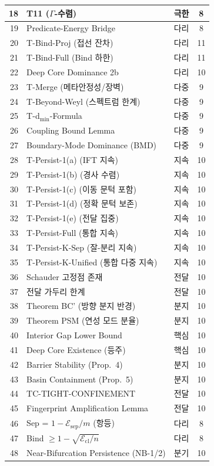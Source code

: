 \begin{table}[h]
\begin{tabular}{rllc}
18 & T11 ($\Gamma$-수렴) & 극한 & 8 \\
\midrule
19 & Predicate-Energy Bridge & 다리 & 8 \\
20 & T-Bind-Proj (접선 잔차) & 다리 & 11 \\
21 & T-Bind-Full (Bind 하한) & 다리 & 11 \\
22 & Deep Core Dominance 2b & 다리 & 10 \\
\midrule
23 & T-Merge (메타안정성/장벽) & 다중 & 9 \\
24 & T-Beyond-Weyl (스펙트럼 한계) & 다중 & 9 \\
25 & T-d$_{\min}$-Formula & 다중 & 9 \\
26 & Coupling Bound Lemma & 다중 & 9 \\
27 & Boundary-Mode Dominance (BMD) & 다중 & 9 \\
\midrule
28 & T-Persist-1(a) (IFT 지속) & 지속 & 10 \\
29 & T-Persist-1(b) (경사 수렴) & 지속 & 10 \\
30 & T-Persist-1(c) (이동 문턱 포함) & 지속 & 10 \\
31 & T-Persist-1(d) (정확 문턱 보존) & 지속 & 10 \\
32 & T-Persist-1(e) (전달 집중) & 지속 & 10 \\
33 & T-Persist-Full (통합 지속) & 지속 & 10 \\
34 & T-Persist-K-Sep (잘-분리 지속) & 지속 & 10 \\
35 & T-Persist-K-Unified (통합 다중 지속) & 지속 & 10 \\
36 & Schauder 고정점 존재 & 전달 & 10 \\
37 & 전달 가두리 한계 & 전달 & 10 \\
\midrule
38 & Theorem BC' (방향 분지 반경) & 분지 & 10 \\
39 & Theorem PSM (연성 모드 분율) & 분지 & 10 \\
40 & Interior Gap Lower Bound & 핵심 & 10 \\
41 & Deep Core Existence (등주) & 핵심 & 10 \\
42 & Barrier Stability (Prop.~4) & 분지 & 10 \\
43 & Basin Containment (Prop.~5) & 분지 & 10 \\
44 & TC-TIGHT-CONFINEMENT & 전달 & 10 \\
45 & Fingerprint Amplification Lemma & 전달 & 10 \\
46 & Sep = $1 - \mathcal{E}_{\mathrm{sep}}/m$ (항등) & 다리 & 8 \\
47 & Bind $\geq 1 - \sqrt{\mathcal{E}_{\mathrm{cl}}/n}$ & 다리 & 8 \\
48 & Near-Bifurcation Persistence (NB-1/2) & 분기 & 10 \\
\bottomrule
\end{tabular}
\end{table}


